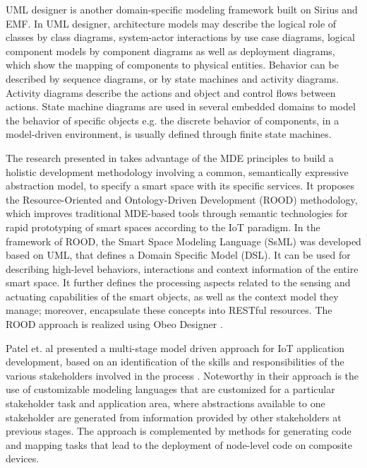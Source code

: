 UML designer \cite{umlDesigner} is another domain-specific modeling framework built on Sirius and EMF. In UML designer, architecture models may describe the logical role of classes by class diagrams, system-actor interactions by use case diagrams, logical component models by component diagrams as well as deployment diagrams, which show the mapping of components to physical entities. Behavior can be described by sequence diagrams, or by state machines and activity diagrams. Activity diagrams describe the actions and object and control flows between actions. State machine diagrams are used in several embedded domains to model the behavior of specific objects e.g. the discrete behavior of components, in a model-driven environment, is usually defined through finite state machines. 

The research presented in \cite{Corredor+2012} takes advantage of the MDE principles to build a holistic development methodology involving a common, semantically expressive abstraction model, to specify a smart space with its specific services. It proposes the Resource-Oriented and Ontology-Driven Development (ROOD) methodology, which improves traditional MDE-based tools through semantic technologies for rapid prototyping of smart spaces according to the IoT paradigm. In the framework of ROOD, the Smart Space Modeling Language (SsML) was developed based on UML, that defines a Domain Specific Model (DSL). It can be used for describing high-level behaviors, interactions and context information of the entire smart space. It further defines the processing aspects related to the sensing and actuating capabilities of the smart objects, as well as the context model they manage; moreover, encapsulate these concepts into RESTful resources. The ROOD approach is realized using Obeo Designer \cite{Designer2016}.

Patel et. al presented a multi-stage model driven approach for IoT application development, based on an identification of the skills and responsibilities of the various stakeholders involved in the process \cite{patel2015enabling}.  Noteworthy in their approach is the use of customizable modeling languages that are customized for a particular stakeholder task and application area, where abstractions available to one stakeholder are generated from information provided by other stakeholders at previous stages. The approach is complemented by methods for generating code and mapping tasks that lead to the deployment of node-level code on composite devices.